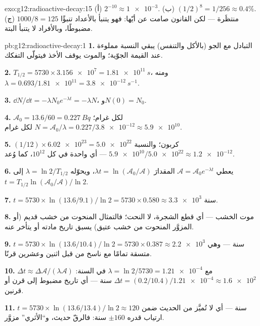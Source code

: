 \begin{solution}{exo:g12:radioactive-decay:15}
(أ) $2^{-10} \approx \num{1e-3}$. (ب) $(1/2)^8 = 1/256 \approx
0.4\%$. (ج) $1000/8 = 125$ منتظَرة --- لكن القانون صامت عن
أيّها: فهو يتنبأ بالأعداد تنبؤًا مضبوطًا، وبالأفراد لا يتنبأ البتة.
\end{solution}

\begin{solution}{pb:g12:radioactive-decay:1}
\textbf{1.} التبادل مع الجو (بالأكل والتنفس) يبقي
النسبة مملوءة عند القيمة الجوّية؛ والموت يوقف
الأخذ فيتولّى التفكك.

\textbf{2.} $T_{1/2} = \num{5730} \times \num{3.156e7} =
\qty{1.81e11}{s}$، ومنه $\lambda = 0.693/\num{1.81e11} =
\qty{3.8e-12}{s^{-1}}$.

\textbf{3.} $\dd N/\dd t = -\lambda N_0 e^{-\lambda t} = -\lambda N$،
و$N(0) = N_0$.

\textbf{4.} $\mathcal A_0 = 13.6/60 = \qty{0.227}{Bq}$ لكل غرام؛
$N = \mathcal A_0/\lambda = 0.227/\num{3.8e-12} \approx \num{5.9e10}$
 لكل غرام.

\textbf{5.} $(1/12) \times \num{6.02e23} = \num{5.0e22}$ 
كربون؛ والنسبة $\num{5.9e10}/\num{5.0e22} \approx \num{1.2e-12}$
--- أي واحدة في كل $10^{12}$، كما وُعد.

\textbf{6.} يعطي $\mathcal A = \mathcal A_0 e^{-\lambda t}$ المقدارَ
$\lambda t = \ln(\mathcal A_0/\mathcal A)$، ويحوّله $\lambda =
\ln 2/T_{1/2}$ إلى
$t = T_{1/2}\ln(\mathcal A_0/\mathcal A)/\ln 2$.

\textbf{7.} $t = \num{5730} \times \ln(13.6/9.1)/\ln 2 =
\num{5730} \times 0.580 \approx \num{3.3e3}$ سنة.

\textbf{8.} موت الخشب --- أي قطع الشجرة، لا
النحت؛ فالتمثال المنحوت من خشب قديم (أو المزوَّر المنحوت من خشب
عتيق) يسبق تاريخ مادته أو يتأخر عنه.

\textbf{9.} $t = \num{5730} \times \ln(13.6/10.4)/\ln 2 =
\num{5730} \times 0.387 \approx \num{2.2e3}$ سنة --- وهي متسقة
تمامًا مع ناسخ من قبل اثنين وعشرين قرنًا.

\textbf{10.} $\Delta t \approx \Delta\mathcal A/(\lambda\mathcal A)$
مع $\lambda = \ln 2/5730 = \num{1.21e-4}$ في السنة:
$\Delta t = (0.2/10.4)/\num{1.21e-4} \approx \num{1.6e2}$ سنة ---
أي تاريخ مضبوط إلى قرن أو قرنين.

\textbf{11.} $t = \num{5730} \times \ln(13.6/13.4)/\ln 2 \approx
120$ سنة --- أي لا تُميَّز من الحديث ضمن ارتياب قدره $\pm 160$
سنة: فالرقّ حديث، و``الأثري'' مزوَّر.


\end{solution}
